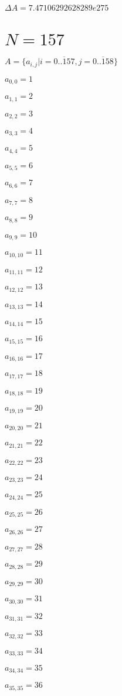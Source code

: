 \documentclass[a4paper,12pt]{article}
\begin{document}
$\Delta A = 7.47106292628289e275$



\section{ $N = 157$ }
$A = \{ a _{ i, j } | i = \overline { 0..157 }, j = \overline { 0..158 } \}$

$a _{ 0, 0 } = 1$

$a _{ 1, 1 } = 2$

$a _{ 2, 2 } = 3$

$a _{ 3, 3 } = 4$

$a _{ 4, 4 } = 5$

$a _{ 5, 5 } = 6$

$a _{ 6, 6 } = 7$

$a _{ 7, 7 } = 8$

$a _{ 8, 8 } = 9$

$a _{ 9, 9 } = 10$

$a _{ 10, 10 } = 11$

$a _{ 11, 11 } = 12$

$a _{ 12, 12 } = 13$

$a _{ 13, 13 } = 14$

$a _{ 14, 14 } = 15$

$a _{ 15, 15 } = 16$

$a _{ 16, 16 } = 17$

$a _{ 17, 17 } = 18$

$a _{ 18, 18 } = 19$

$a _{ 19, 19 } = 20$

$a _{ 20, 20 } = 21$

$a _{ 21, 21 } = 22$

$a _{ 22, 22 } = 23$

$a _{ 23, 23 } = 24$

$a _{ 24, 24 } = 25$

$a _{ 25, 25 } = 26$

$a _{ 26, 26 } = 27$

$a _{ 27, 27 } = 28$

$a _{ 28, 28 } = 29$

$a _{ 29, 29 } = 30$

$a _{ 30, 30 } = 31$

$a _{ 31, 31 } = 32$

$a _{ 32, 32 } = 33$

$a _{ 33, 33 } = 34$

$a _{ 34, 34 } = 35$

$a _{ 35, 35 } = 36$
\end{document}
